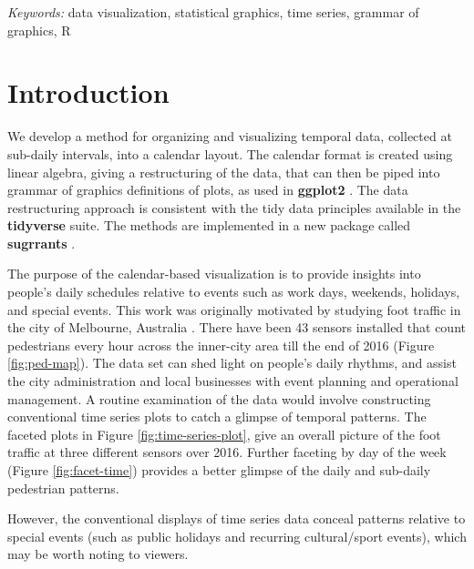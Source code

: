 \documentclass[12pt]{article}
\begin{document}
\noindent%
{\it Keywords:} data visualization, statistical graphics, time series, grammar of graphics, R
\vfill

\newpage
{} %

\hypertarget{introduction}{%
\section{Introduction}\label{introduction}}

We develop a method for organizing and visualizing temporal data,
collected at sub-daily intervals, into a calendar layout. The calendar
format is created using linear algebra, giving a restructuring of the
data, that can then be piped into grammar of graphics definitions of
plots, as used in \textbf{ggplot2} \citep{R-ggplot2}. The data
restructuring approach is consistent with the tidy data principles
available in the \textbf{tidyverse} \citep{R-tidyverse} suite. The
methods are implemented in a new package called \textbf{sugrrants}
\citep{R-sugrrants} .

The purpose of the calendar-based visualization is to provide insights
into people's daily schedules relative to events such as work days,
weekends, holidays, and special events. This work was originally
motivated by studying foot traffic in the city of Melbourne, Australia
\citep{ped}. There have been 43 sensors installed that count pedestrians
every hour across the inner-city area till the end of 2016 (Figure
\ref{fig:ped-map}). The data set can shed light on people's daily
rhythms, and assist the city administration and local businesses with
event planning and operational management. A routine examination of the
data would involve constructing conventional time series plots to catch
a glimpse of temporal patterns. The faceted plots in Figure
\ref{fig:time-series-plot}, give an overall picture of the foot traffic
at three different sensors over 2016. Further faceting by day of the
week (Figure \ref{fig:facet-time}) provides a better glimpse of the
daily and sub-daily pedestrian patterns.

However, the conventional displays of time series data conceal patterns
relative to special events (such as public holidays and recurring
cultural/sport events), which may be worth noting to viewers.
\end{document}
